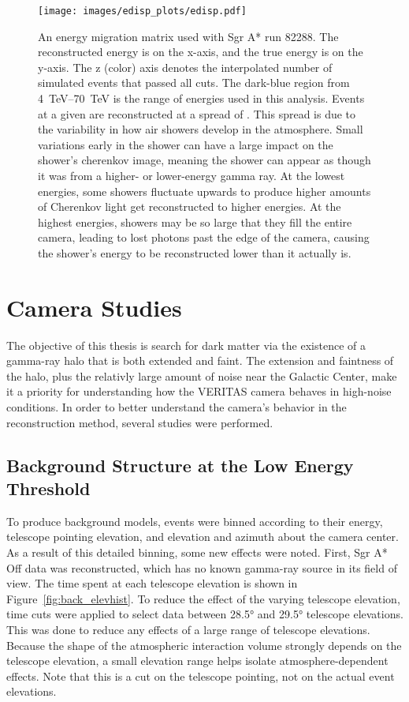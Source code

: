     \begin{figure}[!th]
      \centering
      \texttt{[image: images/edisp\_plots/edisp.pdf]}
      \caption[Energy Migration Matrix]{
        An energy migration matrix used with Sgr A* run 82288.
        The reconstructed energy is on the x-axis, and the true energy is on the y-axis.
        The z (color) axis denotes the interpolated number of simulated events that passed all cuts.
        The dark-blue region from \SIrange{4}{70}{TeV} \EReco{} is the range of energies used in this analysis.
        Events at a given \ETrue{} are reconstructed at a spread of \EReco{}.
        This spread is due to the variability in how air showers develop in the atmosphere.
        Small variations early in the shower can have a large impact on the shower's cherenkov image, meaning the shower can appear as though it was from a higher- or lower-energy gamma ray.
        At the lowest \ETrue{} energies, some showers fluctuate upwards to produce higher amounts of Cherenkov light get reconstructed to higher \EReco{} energies.
        At the highest \ETrue{} energies, showers may be so large that they fill the entire camera, leading to lost photons past the edge of the camera, causing the shower's energy to be reconstructed lower than it actually is.
      }
      \label{fig:migmatrix}
    \end{figure}
  
  \FloatBarrier

\section{Camera Studies}
  The objective of this thesis is search for dark matter via the existence of a gamma-ray halo that is both extended and faint.
  The extension and faintness of the halo, plus the relativly large amount of noise near the Galactic Center, make it a priority for understanding how the VERITAS camera behaves in high-noise conditions.
  In order to better understand the camera's behavior in the reconstruction method, several studies were performed.

  \subsection{Background Structure at the Low Energy Threshold}\label{subsec:bkgstructure}
    To produce background models, events were binned according to their energy, telescope pointing elevation, and elevation and azimuth about the camera center.
    As a result of this detailed binning, some new effects were noted.
    First, Sgr A* Off data was reconstructed, which has no known gamma-ray source in its field of view.
    The time spent at each telescope elevation is shown in Figure~\ref{fig:back_elevhist}.
    To reduce the effect of the varying telescope elevation, time cuts were applied to select data between \ang{28.5} and \ang{29.5} telescope elevations.
    This was done to reduce any effects of a large range of telescope elevations.
    Because the shape of the atmospheric interaction volume strongly depends on the telescope elevation, a small elevation range helps isolate atmosphere-dependent effects.
    Note that this is a cut on the telescope pointing, not on the actual event elevations.


